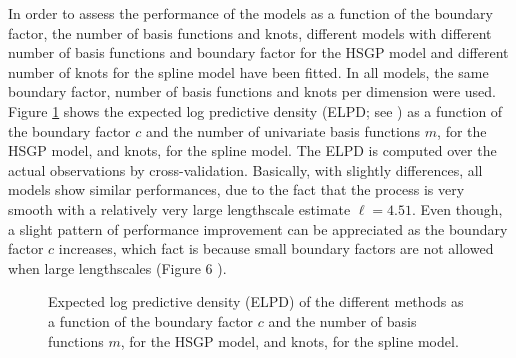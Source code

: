 \documentclass[onecolumn,a4paper,11pt]{article}
\begin{document}
In order to assess the performance of the models as a function of the boundary factor, the number of basis functions and knots, different models with different number of basis functions and boundary factor for the HSGP model and different number of knots for the spline model have been fitted. In all models, the same boundary factor, number of basis functions and knots per dimension were used. Figure \ref{ch5_fig19_ELPD_diabetes} shows the expected log predictive density (ELPD; see \cite{vehtari_2012}) as a function of the boundary factor $c$ and the number of univariate basis functions $m$, for the HSGP model, and knots, for the spline model. The ELPD is computed over the actual observations by cross-validation. Basically, with slightly differences, all models show similar performances, due to the fact that the process is very smooth with a relatively very large lengthscale estimate $\ell=4.51$. Even though, a slight pattern of performance improvement can be appreciated as the boundary factor $c$ increases, which fact is because small boundary factors are not allowed when large lengthscales (Figure 6%
).
%
\begin{figure}
\centering
{}
\caption{Expected log predictive density (ELPD) of the different methods as a function of the boundary factor $c$ and the number of basis functions $m$, for the HSGP model, and knots, for the spline model.}
  \label{ch5_fig19_ELPD_diabetes}
\end{figure}
\end{document}
